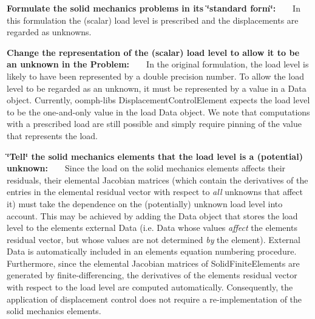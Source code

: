 \begin{DoxyEnumerate}
\item {\bfseries Formulate the solid mechanics problems in its \char`\"{}standard
   form\char`\"{}\+:} ~\newline
~\newline
 In this formulation the (scalar) load level is prescribed and the displacements are regarded as unknowns. ~\newline
~\newline

\item {\bfseries Change the representation of the (scalar) load level to allow it to be an unknown in the Problem\+:} ~\newline
~\newline
 In the original formulation, the load level is likely to have been represented by a double precision number. To allow the load level to be regarded as an unknown, it must be represented by a value in a {\ttfamily Data} object. Currently, {\ttfamily oomph-\/lib\textquotesingle{}s} {\ttfamily Displacement\+Control\+Element} expects the load level to be the one-\/and-\/only value in the load {\ttfamily Data} object. We note that computations with a prescribed load are still possible and simply require pinning of the value that represents the load. ~\newline
~\newline

\item {\bfseries \char`\"{}\+Tell\char`\"{} the solid mechanics elements that the load level is a (potential) unknown\+:} ~\newline
~\newline
 Since the load on the solid mechanics elements affects their residuals, their elemental Jacobian matrices (which contain the derivatives of the entries in the elemental residual vector with respect to {\itshape all} unknowns that affect it) must take the dependence on the (potentially) unknown load level into account. This may be achieved by adding the {\ttfamily Data} object that stores the load level to the element\textquotesingle{}s external {\ttfamily Data} (i.\+e. {\ttfamily Data} whose values {\itshape affect} the element\textquotesingle{}s residual vector, but whose values are not determined {\itshape by} the element). External {\ttfamily Data} is automatically included in an element\textquotesingle{}s equation numbering procedure. Furthermore, since the elemental Jacobian matrices of {\ttfamily Solid\+Finite\+Elements} are generated by finite-\/differencing, the derivatives of the element\textquotesingle{}s residual vector with respect to the load level are computed automatically. Consequently, the application of displacement control does not require a re-\/implementation of the solid mechanics elements. ~\newline
~\newline


\end{DoxyEnumerate}
